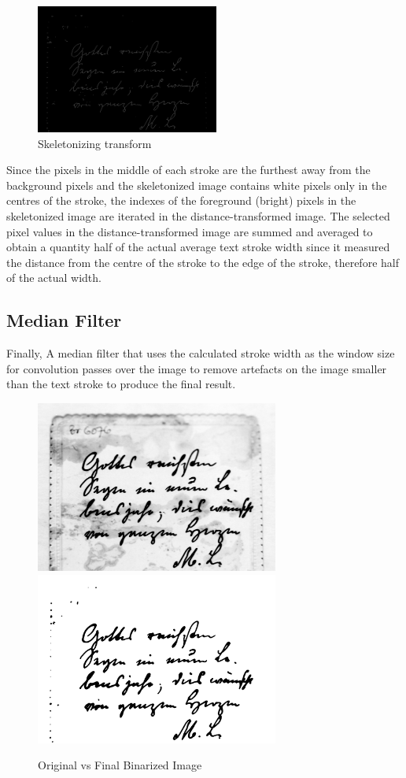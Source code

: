 \documentclass[a4paper, 12pt]{report}
\begin{document}
\begin{figure}[ht]
    \centering
    \includegraphics[width=6cm]{skeletonized.png}
    \caption{Skeletonizing transform}
    \label{fig:6}
\end{figure}

Since the pixels in the middle of each stroke are the furthest away from the background pixels and the skeletonized image contains white pixels only in the centres of the stroke, the indexes of the foreground (bright) pixels in the skeletonized image are iterated in the distance-transformed image. The selected pixel values in the distance-transformed image are summed and averaged to obtain a quantity half of the actual average text stroke width since it measured the distance from the centre of the stroke to the edge of the stroke, therefore half of the actual width.

\subsection{Median Filter}
Finally, A median filter that uses the calculated stroke width as the window size for convolution passes over the image to remove artefacts on the image smaller than the text stroke to produce the final result.

\begin{figure}[ht]
    \centering
    \includegraphics[width=8cm]{original.png}
    \includegraphics[width=8cm]{output.png}
    \caption{Original vs Final Binarized Image}
    \label{fig:7}
\end{figure}
\end{document}
